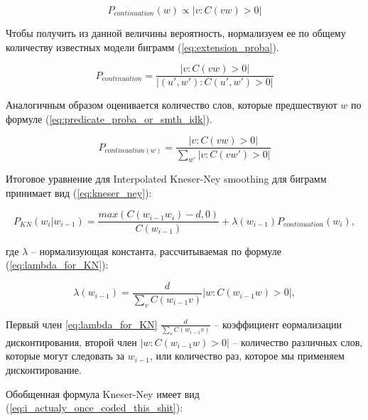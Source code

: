 \begin{equation}
	P_{continuation}(w) \propto |{v: C(vw) > 0}|
	\label{eq:extension_count}
\end{equation}

Чтобы получить из данной величины вероятность, нормализуем ее по общему количеству известных модели биграмм (\ref{eq:extension_proba}).

\begin{equation}
	P_{continuation} = \frac{|{v:C(vw) > 0}|}{|{(u', w'): C(u', w') > 0}|}
	\label{eq:extension_proba}
\end{equation}

Аналогичным образом оценивается количество слов, которые предшествуют $w$ по формуле (\ref{eq:predicate_proba_or_smth_idk}).

\begin{equation}
	P_{continuation(w)} = \frac{|{v:C(vw) > 0}|}{\sum_{w'}{|{v:C(vw') > 0}|}}
	\label{eq:predicate_proba_or_smth_idk}
\end{equation}

Итоговое уравнение для Interpolated Kneser-Ney smoothing для биграмм принимает вид (\ref{eq:kneser_ney}):

\begin{equation}
	P_{KN}(w_i|w_{i-1}) = \frac{max(C(w_{i-1}w_i) - d, 0)}{C(w_{i-1})} + \lambda(w_{i-1}) P_{continuation}(w_i),
	\label{eq:kneser_ney}
\end{equation}
\begin{explanation}
	где $\lambda$ -- нормализующая константа, рассчитываемая по формуле (\ref{eq:lambda_for_KN}):
\end{explanation}

\begin{equation}
	\lambda(w_{i-1}) = \frac{d}{\sum_v{C(w_{i-1}v)}}|{w:C(w_{i-1}w) > 0}|
	\label{eq:lambda_for_KN},
\end{equation}

Первый член \ref{eq:lambda_for_KN} $\frac{d}{\sum_v{C(w_{i-1}v)}}$ -- коэффициент еормализации дисконтирования, второй член $|{w:C(w_{i-1}w) > 0}|$ -- количество различных слов, которые могут следовать за $w_{i-1}$, или количество раз, которое мы применяем дисконтирование.

Обобщенная формула Kneser-Ney имеет вид (\ref{eq:i_actualy_once_coded_this_shit}):

